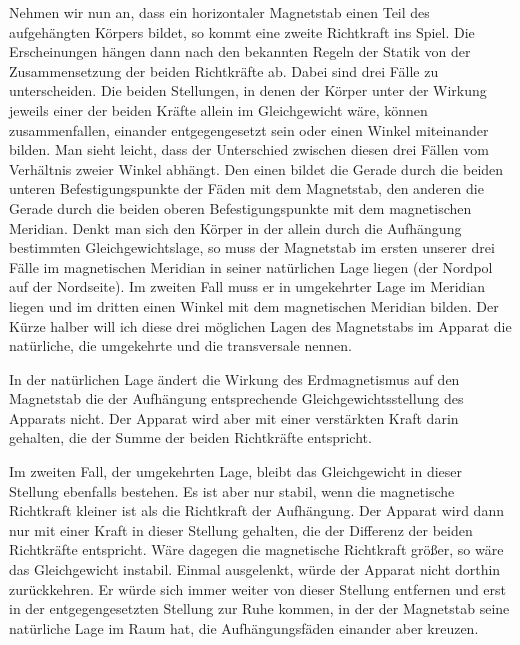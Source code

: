 Nehmen wir nun an, dass ein horizontaler Magnetstab einen Teil des aufgehängten Körpers bildet, so kommt eine zweite Richtkraft ins Spiel. Die Erscheinungen hängen dann nach den bekannten Regeln der Statik von der Zusammensetzung der beiden Richtkräfte ab. Dabei sind drei Fälle zu unterscheiden. Die beiden Stellungen, in denen der Körper unter der Wirkung jeweils einer der beiden Kräfte allein im Gleichgewicht wäre, können zusammenfallen, einander entgegengesetzt sein oder einen Winkel miteinander bilden. Man sieht leicht, dass der Unterschied zwischen diesen drei Fällen vom Verhältnis zweier Winkel abhängt. Den einen bildet die Gerade durch die beiden unteren Befestigungspunkte der Fäden mit dem Magnetstab, den anderen die Gerade durch die beiden oberen Befestigungspunkte mit dem magnetischen Meridian. Denkt man sich den Körper in der allein durch die Aufhängung bestimmten Gleichgewichtslage, so muss der Magnetstab im ersten unserer drei Fälle im magnetischen Meridian in seiner natürlichen Lage liegen (der Nordpol auf der Nordseite). Im zweiten Fall muss er in umgekehrter Lage im Meridian liegen und im dritten einen Winkel mit dem magnetischen Meridian bilden. Der Kürze halber will ich diese drei möglichen Lagen des Magnetstabs im Apparat die natürliche, die umgekehrte und die transversale nennen.

In der natürlichen Lage ändert die Wirkung des Erdmagnetismus auf den Magnetstab die der Aufhängung entsprechende Gleichgewichtsstellung des Apparats nicht. Der Apparat wird aber mit einer verstärkten Kraft darin gehalten, die der Summe der beiden Richtkräfte entspricht.

Im zweiten Fall, der umgekehrten Lage, bleibt das Gleichgewicht in dieser Stellung ebenfalls bestehen. Es ist aber nur stabil, wenn die magnetische Richtkraft kleiner ist als die Richtkraft der Aufhängung. Der Apparat wird dann nur mit einer Kraft in dieser Stellung gehalten, die der Differenz der beiden Richtkräfte entspricht. Wäre dagegen die magnetische Richtkraft größer, so wäre das Gleichgewicht instabil. Einmal ausgelenkt, würde der Apparat nicht dorthin zurückkehren. Er würde sich immer weiter von dieser Stellung entfernen und erst in der entgegengesetzten Stellung zur Ruhe kommen, in der der Magnetstab seine natürliche Lage im Raum hat, die Aufhängungsfäden einander aber kreuzen.

